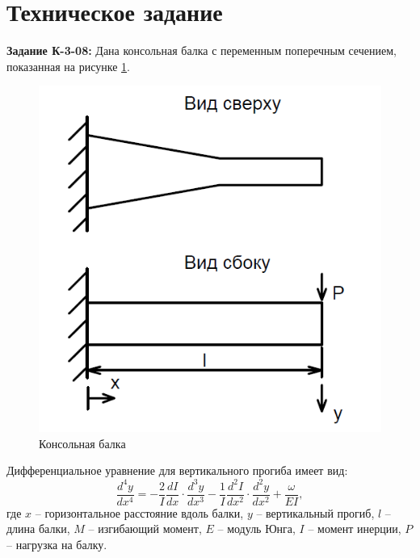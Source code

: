 





\section{Техническое задание}

\textbf{Задание К-3-08:} Дана консольная балка с переменным поперечным сечением, показанная на рисунке \ref{img:balka}.

\begin{figure}[H]
\begin{center}
	\vspace{-0.5cm}
	\includegraphics[scale=0.45]{balka}
	\caption{Консольная балка}
	\label{img:balka}
	\vspace{-0.5cm}
\end{center}
\end{figure}

Дифференциальное уравнение для вертикального прогиба имеет вид:
\[
\frac{d^4y}{dx^4} = - \frac{2}{I} \frac{dI}{dx}\cdot \frac{d^3y}{dx^3} -  \frac{1}{I} \frac{d^2I}{dx^2}\cdot \frac{d^2y}{dx^2} + \frac{\omega}{EI},
\]
где $x$ -- горизонтальное расстояние вдоль балки, $y$ -- вертикальный прогиб, $l$ -- длина балки, $M$ -- изгибающий момент, $E$ -- модуль Юнга, $I$ -- момент инерции, $P$ -- нагрузка на балку.

